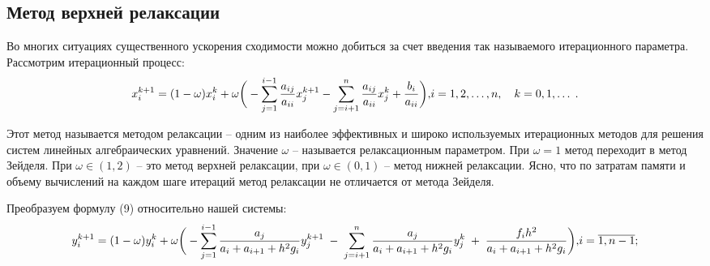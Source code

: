 \documentclass[a4paper,12pt]{article}
\begin{document}
{		\subsection{Метод верхней релаксации}
		\hspace{1.25cm}Во многих ситуациях существенного ускорения сходимости можно добиться за счет введения так называемого итерационного параметра. 
		Рассмотрим итерационный процесс:
		\begin{equation}
			x_i^{k+1}=(1-\omega)x_i^k+\omega \bigg( - \sum\limits_{j=1}^{i-1} \frac{a_{ij}}{a_{ii}}x_j^{k+1}- \sum\limits_{j=i+1}^{n} \frac{a_{ij}}{a_{ii}}x_j^{k}+\frac{b_i}{a_{ii}}\bigg),
			$$$$ i=1,2, \dots, n, \quad k=0,1, \dots \; .
			\label{9}
		\end{equation}
		
		Этот метод называется методом релаксации -- одним из наиболее эффективных и широко используемых итерационных 
		методов для решения систем линейных алгебраичес\-ких уравнений. Значение $\omega $ -- называется релаксационным параметром. 
		При $\omega = 1$ метод переходит в метод Зейделя. При $\omega \in (1,2)$ -- это метод верхней релаксации, при $\omega \in (0,1)$ -- метод нижней релаксации. 
		Ясно, что по затратам памяти и объему вычислений на каждом шаге итераций метод релаксации не отличается от метода Зейделя.
		
		Преобразуем формулу (9) относительно нашей системы:
		\begin{equation}
			y_i^{k+1}=(1-\omega)y_i^k+\omega  \bigg(-\sum\limits_{j=1}^{i-1}\frac{a_j}{a_i+a_{i+1}+h^2 g_i}y_j^{k+1} \; - \;\sum\limits_{j=i+1}^{n}\frac{a_{j}}{a_i+a_{i+1}+h^2 g_i}y_j^k\; +\; \frac{f_i h^2}{a_i+a_{i+1}+h^2 g_i}\bigg),$$$$
			i=\overline{1, n-1};
			\label{10}
		\end{equation}
		
}
\end{document}
